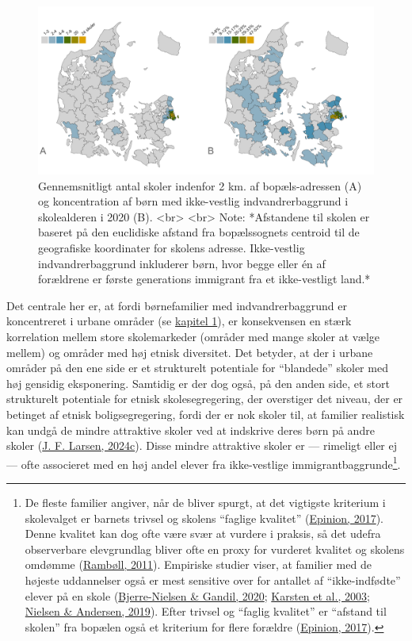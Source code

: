 \documentclass[
]{book}
\begin{document}
\begin{figure}
\includegraphics[width=1\linewidth]{images/figur_3_1c_distance_antal} \caption{Gennemsnitligt antal skoler indenfor 2 km. af bopæls-adressen (A) og koncentration af børn med ikke-vestlig indvandrerbaggrund i skolealderen i 2020 (B). <br> <br> Note: *Afstandene til skolen er baseret på den euclidiske afstand fra bopælssognets centroid til de geografiske koordinater for skolens adresse. Ikke-vestlig indvandrerbaggrund inkluderer børn, hvor begge eller én af forældrene er første generations immigrant fra et ikke-vestligt land.*}\label{fig:fig-3-1}
\end{figure}

Det centrale her er, at fordi børnefamilier med indvandrerbaggrund er koncentreret i urbane områder (se \protect\hyperlink{kap1}{kapitel 1}), er konsekvensen en stærk korrelation mellem store skolemarkeder (områder med mange skoler at vælge mellem) og områder med høj etnisk diversitet. Det betyder, at der i urbane områder på den ene side er et strukturelt potentiale for ``blandede'' skoler med høj gensidig eksponering. Samtidig er der dog også, på den anden side, et stort strukturelt potentiale for etnisk skolesegregering, der overstiger det niveau, der er betinget af etnisk boligsegregering, fordi der er nok skoler til, at familier realistisk kan undgå de mindre attraktive skoler ved at indskrive deres børn på andre skoler (\protect\hyperlink{ref-larsen2024b}{J. F. Larsen, 2024c}). Disse mindre attraktive skoler er --- rimeligt eller ej --- ofte associeret med en høj andel elever fra ikke-vestlige immigrantbaggrunde\footnote{De fleste familier angiver, når de bliver spurgt, at det vigtigste kriterium i skolevalget er barnets trivsel og skolens ``faglige kvalitet'' (\protect\hyperlink{ref-epinion2017}{Epinion, 2017}). Denne kvalitet kan dog ofte være svær at vurdere i praksis, så det udefra observerbare elevgrundlag bliver ofte en proxy for vurderet kvalitet og skolens omdømme (\protect\hyperlink{ref-rambuxf8ll2011}{Rambøll, 2011}). Empiriske studier viser, at familier med de højeste uddannelser også er mest sensitive over for antallet af ``ikke-indfødte'' elever på en skole (\protect\hyperlink{ref-bjerrenielsen2020}{Bjerre-Nielsen \& Gandil, 2020}; \protect\hyperlink{ref-karsten2003}{Karsten et al., 2003}; \protect\hyperlink{ref-nielsen2019}{Nielsen \& Andersen, 2019}). Efter trivsel og ``faglig kvalitet'' er ``afstand til skolen'' fra bopælen også et kriterium for flere forældre (\protect\hyperlink{ref-epinion2017}{Epinion, 2017}).}.
\end{document}
